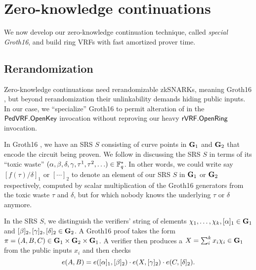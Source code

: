
\section{Zero-knowledge continuations}
\label{sec:rvrf_cont}

We now develop our zero-knowledge continuation technique, called 
{\em special Groth16}, and build ring VRFs with fast amortized prover time.


\subsection{Rerandomization}

Zero-knowledge continuations need rerandomizable zkSNARKs,
meaning Groth16 \cite{Groth16}, but beyond rerandomization their
unlinkability demands hiding public inputs.
In our case, we ``specialize'' Groth16 to permit alteration of \openpk
in the ${\mathsf{PedVRF}}.{\mathsf{OpenKey}}$ invocation without reproving our heavy
${\mathsf{rVRF}}.{\mathsf{OpenRing}}$ invocation.

In Groth16 \cite{Groth16}, we have an SRS $S$ consisting of curve
points in ${\mathbf{G}}_1$ and ${\mathbf{G}}_2$ that encode the circuit being proven.
We follow \cite{Groth16} in discussing the SRS $S$ in terms of
its ``toxic waste''
 $(\alpha,\beta,\delta,\gamma,\tau^1,\tau^2,\ldots) \in \mathbb{F}_q^*$.
In other words, we could write say $[ f(\tau)/\delta ]_1$ or $[\cdots]_2$
to denote an element of our SRS $S$ in ${\mathbf{G}}_1$ or ${\mathbf{G}}_2$ respectively,
computed by scalar multiplication of the Groth16 generators from
the toxic waste $\tau$ and $\delta$,
 but for which nobody knows the underlying $\tau$ or $\delta$ anymore.

In the SRS $S$, we distinguish the verifiers' string of elements
 $\chi_1,\ldots,\chi_k, [\alpha]_1 \in {\mathbf{G}}_1$ and
 $[\beta]_2, [\gamma]_2, [\delta]_2 \in {\mathbf{G}}_2$.
A Groth16 \cite{Groth16} proof takes the form 
 $\pi = (A,B,C) \in {\mathbf{G}}_1 \times {\mathbf{G}}_2 \times {\mathbf{G}}_1$.
A verifier then produces a $X = \sum_i^k x_i \chi_i \in {\mathbf{G}}_1$ from
 the public inputs $x_i$ and then checks 
$$ e(A,B) = e([\alpha]_1, [\beta]_2) \cdot
 e(X, [\gamma]_2) \cdot e(C, [\delta]_2) . $$

